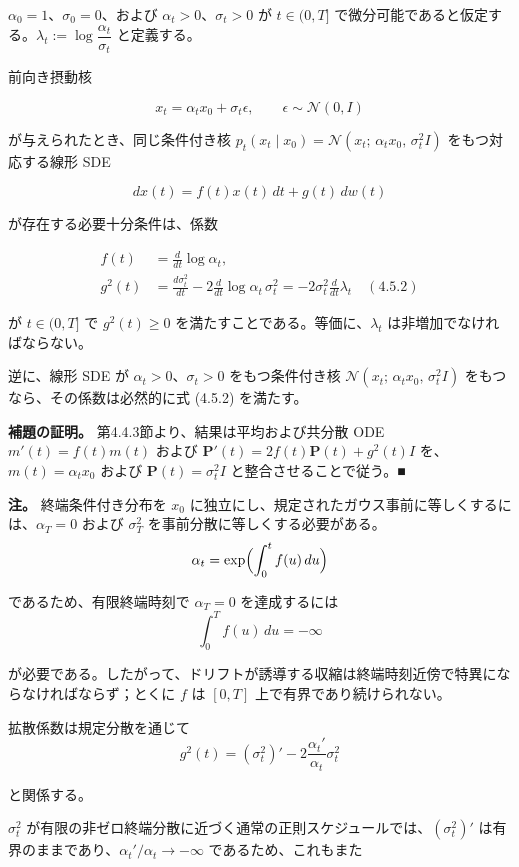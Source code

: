 \begin{propositionbox}
$\alpha_0=1$、$\sigma_0=0$、および $\alpha_t>0$、$\sigma_t>0$ が $t\in(0,T]$ で微分可能であると仮定する。$\lambda_t:=\log\dfrac{\alpha_t}{\sigma_t}$ と定義する。

前向き摂動核

\[
x_t=\alpha_t x_0+\sigma_t\epsilon, \qquad \epsilon\sim\mathcal{N}(0,I)
\]

が与えられたとき、同じ条件付き核 $p_t(x_t\mid x_0)=\mathcal{N}(x_t;\,\alpha_t x_0,\,\sigma_t^2 I)$ をもつ対応する線形 SDE

\[
dx(t)=f(t)x(t)\, dt + g(t)\, dw(t)
\]

が存在する必要十分条件は、係数

\[
\begin{aligned}
f(t)&=\frac{d}{dt}\log\alpha_t, \\
g^2(t)&=\frac{d\sigma_t^2}{dt}-2\frac{d}{dt}\log\alpha_t\,\sigma_t^2
=-2\sigma_t^2\frac{d}{dt}\lambda_t \quad (4.5.2)
\end{aligned}
\]

が $t\in(0,T]$ で $g^2(t)\ge 0$ を満たすことである。等価に、$\lambda_t$ は非増加でなければならない。

逆に、線形 SDE が $\alpha_t>0$、$\sigma_t>0$ をもつ条件付き核 $\mathcal{N}(x_t;\,\alpha_t x_0,\,\sigma_t^2 I)$ をもつなら、その係数は必然的に式 (4.5.2) を満たす。
\end{propositionbox}


\textbf{補題の証明。}
第4.4.3節より、結果は平均および共分散 ODE $m'(t)=f(t)m(t)$ および $\mathbf{P}'(t)=2f(t)\mathbf{P}(t)+g^2(t)I$ を、$m(t)=\alpha_t x_0$ および $\mathbf{P}(t)=\sigma_t^2 I$ と整合させることで従う。■

\textbf{注。}
終端条件付き分布を $x_0$ に独立にし、規定されたガウス事前に等しくするには、$\alpha_T=0$ および $\sigma_T^2$ を事前分散に等しくする必要がある。
\[
\alpha_t=\exp\Bigl(\int_0^t f(u)\, du\Bigr)
\]

であるため、有限終端時刻で $\alpha_T=0$ を達成するには
\[
\int_0^T f(u)\, du=-\infty
\]

が必要である。したがって、ドリフトが誘導する収縮は終端時刻近傍で特異にならなければならず；とくに $f$ は $[0,T]$ 上で有界であり続けられない。

拡散係数は規定分散を通じて
\[
g^2(t)=(\sigma_t^2)'-2\frac{\alpha_t'}{\alpha_t}\sigma_t^2
\]

と関係する。

$\sigma_t^2$ が有限の非ゼロ終端分散に近づく通常の正則スケジュールでは、$(\sigma_t^2)'$ は有界のままであり、$\alpha_t'/\alpha_t\to-\infty$ であるため、これもまた

